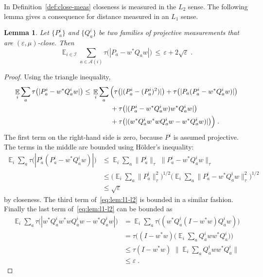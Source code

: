 \documentclass[11pt]{article}
\newtheorem{lemma}[theorem]{Lemma}
\theoremstyle{definition}
\DeclareMathOperator*{\Expectation}{\mathbb{E}}
\newcommand{\Es}[1]{\Expectation_{#1}}
\newcommand{\mA}{\ensuremath{\mathcal{A}}}
\newcommand{\mI}{\ensuremath{\mathcal{I}}}
\newcommand{\eps}{\varepsilon}
\begin{document}
In Definition~\ref{def:close-meas} closeness is measured in the $L_2$ sense. The following lemma gives a consequence for distance measured in an $L_1$ sense. 


\begin{lemma}\label{lem:l1-l2}
Let $\{P_a^i\}$ and $\{Q_a^i\}$ be two families of projective measurements that are $(\eps,\mu)$-close. Then 
\begin{equation}\label{eq:l1-l2}
\Es{i\in\mI} \sum_{a\in \mA(i)} \tau\big(|P_a-w^*Q_aw|\big) \,\leq\, \eps+ 2 \sqrt{\eps}\;.
\end{equation}
\end{lemma}

\begin{proof}
Using the triangle inequality, 
\begin{align}
\Es{i} \sum_a \tau\big(|P^i_a - w^* Q^i_a w|\big) &\leq\, \Es{i}\sum_a \Big(\tau\big(|(P^i_a-(P^i_a)^2)|\big) + \tau\big(|P_a(P^i_a-w^*Q^i_aw)|\big) \notag\\
&\qquad\qquad+ \tau\big(|(P^i_a-w^*Q^i_aw)w^*Q^i_aw|\big) \notag \\
&\qquad \qquad+\tau\big(| (w^*Q^i_aw^*wQ^i_aw-w^*Q^i_aw)|\big)\Big)\;. \label{eq:lem:l1-l2}
\end{align}
The first term on the right-hand side is zero, because $P^i$ is assumed projective. The terms in the middle are bounded using H\"older's inequality:
\begin{align*}
\Es{i}\sum_a  \tau\big(|P^i_a(P^i_a-w^*Q^i_aw)|\big) &\leq \Es{i} \sum_a \|P^i_a\|_\tau \, \, \|P^i_a-w^*Q^i_aw\|_\tau\\
&\leq \Big(\Es{i}\sum_a \|P^i_a\|_\tau^2\Big)^{1/2}\Big( \Es{i}\sum_a  \|P^i_a-w^*Q^i_aw\|_\tau^2 \Big)^{1/2}\\
&\leq \sqrt{\eps}
\end{align*}
by closeness. The third term of~\eqref{eq:lem:l1-l2} is bounded in a similar fashion.
Finally the last term of~\eqref{eq:lem:l1-l2} can be bounded as 
\begin{align*}
\Es{i}\sum_a \tau\big(| w^*Q^i_aw^*wQ^i_aw-w^*Q^i_aw|\big) &= \Es{i}\sum_a \tau\big( (w^*Q^i_a(I - w^*w)Q^i_aw)\big)\\
&=  \tau\Big( (I-w^*w)\Big(\Es{i}\sum_a Q^i_aww^* Q^i_a\Big)\Big)\\
&\leq \tau(I-w^*w) \,\, \Big\|\Es{i}\sum_a Q^i_aww^* Q^i_a\Big\|\\
&\leq \eps\;.
\end{align*}
\end{proof}
\end{document}
